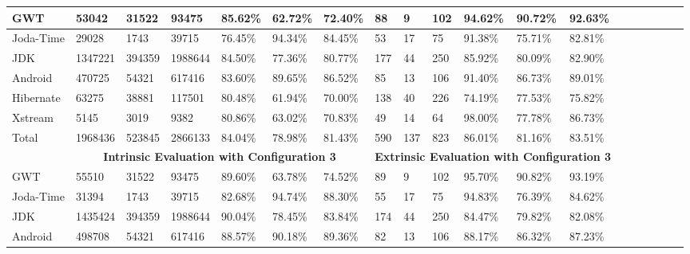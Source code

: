 \begin{table}[t]
\begin{tabular}{|l|l|l|l|l|l|l|l|l|l|l|l|l|l|l|l|l|l|l|}
\hline
GWT       & 53042                                     & 31522  & 93475   & 85.62\%   & 62.72\% & 72.40\%    & 88              & 9     & 102   & 94.62\%   & 90.72\% & 92.63\%  \\ \hline
Joda-Time & 29028                                     & 1743   & 39715   & 76.45\%   & 94.34\% & 84.45\%  & 53             & 17    & 75    & 91.38\%   & 75.71\% & 82.81\% \\
\hline
JDK       & 1347221                                    & 394359 & 1988644 & 84.50\%   & 77.36\% & 80.77\%  & 177            & 44    & 250   & 85.92\%   & 80.09\% & 82.90\%  \\
\hline
Android   & 470725                                    & 54321  & 617416  & 83.60\%   & 89.65\% & 86.52\% & 85             & 13    & 106   & 91.40\%   & 86.73\% & 89.01\%  \\
\hline
Hibernate & 63275                                     & 38881  & 117501  & 80.48\%   & 61.94\% & 70.00\% & 138            & 40    & 226   & 74.19\%   & 77.53\% & 75.82\%  \\
\hline
Xstream   & 5145                                      & 3019   & 9382    & 80.86\%   & 63.02\% & 70.83\% & 49             & 14    & 64    & 98.00\%   & 77.78\% & 86.73\%  \\
\hline
Total     & 1968436                                   & 523845 & 2866133 & 84.04\%   & 78.98\% & 81.43\%   & 590           & 137   & 823   & 86.01\%   & 81.16\% & 83.51\%     \\
\hline
          & \multicolumn{6}{c|}{\textbf{Intrinsic Evaluation with Configuration 3}}      & \multicolumn{6}{c|}{\textbf{Extrinsic Evaluation with Configuration 3}}            \\
\hline
GWT       & 55510                                     & 31522  & 93475   & 89.60\%   & 63.78\% & 74.52\%    & 89              & 9     & 102   & 95.70\%   & 90.82\% & 93.19\%  \\
\hline
Joda-Time & 31394                                     & 1743   & 39715   & 82.68\%   & 94.74\% & 88.30\%  & 55             & 17    & 75    & 94.83\%   & 76.39\% & 84.62\%  \\
\hline
JDK       & 1435424                                    & 394359 & 1988644 & 90.04\%   & 78.45\% & 83.84\%  & 174            & 44    & 250   & 84.47\%   & 79.82\% & 82.08\%  \\
\hline
Android   & 498708                                    & 54321  & 617416  & 88.57\%   & 90.18\% & 89.36\% & 82             & 13    & 106   & 88.17\%   & 86.32\% & 87.23\%  \\

\end{tabular}
\end{table}
